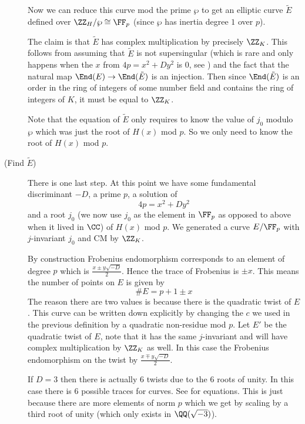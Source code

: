 \documentclass[11pt]{article}
\begin{document}
\begin{description}
	Now we can reduce this curve mod the prime $\wp$ to get an elliptic curve $\tilde{E}$ defined over $\ZZ_H/\wp \cong \FF_p$ (since $\wp$ has inertia degree $1$ over $p$).
	
	The claim is that $\tilde{E}$ has complex multiplication by precisely $\ZZ_K$. This follows from assuming that $\tilde{E}$ is not supersingular (which is rare and only happens when the $x$ from $4p = x^2 + Dy^2$ is $0$, see \cite[Ex.~5.10b]{silverman2009arithmetic}) and the fact that the natural map $\End(E) \to \End(\tilde{E})$ is an injection. Then since $\End(\tilde{E})$ is an order in the ring of integers of some number field and contains the ring of integers of $K$, it must be equal to $\ZZ_K$.
	
	Note that the equation of $\tilde{E}$ only requires to know the value of $j_0$ modulo $\wp$ which was just the root of $H(x)$ mod $p$. So we only need to know the root of $H(x)$ mod $p$.
	
	\item[(Find $\tilde{E}$)]
	
	There is one last step. At this point we have some fundamental discriminant $-D$, a prime $p$, a solution of
	$$
	4p = x^2 + Dy^2
	$$
	and a root $j_0$ (we now use $j_0$ as the element in $\FF_p$ as opposed to above when it lived in $\CC$) of $H(x)$ mod $p$. We generated a curve $E/\FF_p$ with $j$-invariant $j_0$ and CM by $\ZZ_K$.
	
	By construction Frobenius endomorphism corresponds to an element of degree $p$ which is $\frac{x \pm y\sqrt{-D}}{2}$. Hence the trace of Frobenius is $\pm x$. This means the number of points on $E$ is given by
	$$
	\#E = p + 1 \pm x
	$$
	The reason there are two values is because there is the quadratic twist of $E$. This curve can be written down explicitly by changing the $c$ we used in the previous definition by a quadratic non-residue mod $p$. Let $E'$ be the quadratic twist of $E$, note that it has the same $j$-invariant and will have complex multiplication by $\ZZ_K$ as well. In this case the Frobenius endomorphism on the twist by $\frac{x \mp y\sqrt{-D}}{2}$.
	
	\begin{warn}
		If $D = 3$ then there is actually $6$ twists due to the $6$ roots of unity. In this case there is $6$ possible traces for curves. See \cite[A.14.2.3, Pg.~151]{ieee2000standards} for equations. This is just because there are more elements of norm $p$ which we get by scaling by a third root of unity (which only exists in $\QQ(\sqrt{-3})$).
		

\end{warn}
\end{description}
\end{document}
